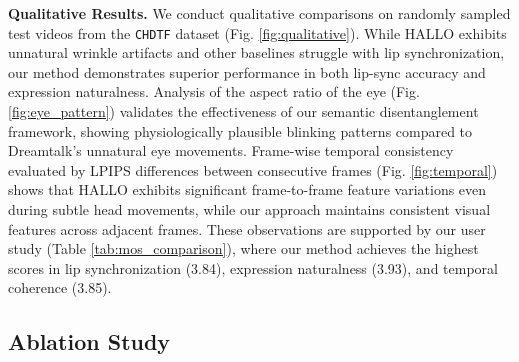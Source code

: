 \documentclass[conference]{IEEEtran}
\begin{document}
\begin{table}[t]
\centering
\caption{Comparison of mean opinion scores (MOS) with standard deviations across different methods. }
\label{tab:mos_comparison}
\end{table}
\noindent\textbf{Qualitative Results.} 
We conduct qualitative comparisons on randomly sampled test videos from the \texttt{CHDTF} dataset (Fig. \ref{fig:qualitative}). While HALLO exhibits unnatural wrinkle artifacts and other baselines struggle with lip synchronization, our method demonstrates superior performance in both lip-sync accuracy and expression naturalness. Analysis of the aspect ratio of the eye (Fig. \ref{fig:eye_pattern}) validates the effectiveness of our semantic disentanglement framework, showing physiologically plausible blinking patterns compared to Dreamtalk's unnatural eye movements. Frame-wise temporal consistency evaluated by LPIPS \cite{lpips} differences between consecutive frames (Fig. \ref{fig:temporal}) shows that HALLO exhibits significant frame-to-frame feature variations even during subtle head movements, while our approach maintains consistent visual features across adjacent frames. These observations are supported by our user study (Table \ref{tab:mos_comparison}), where our method achieves the highest scores in lip synchronization (3.84), expression naturalness (3.93), and temporal coherence (3.85). 






\subsection{Ablation Study}
\end{document}

